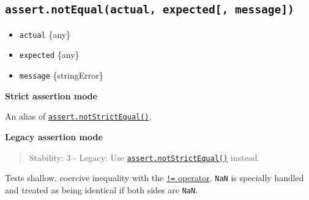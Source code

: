 \subsection{\texorpdfstring{\texttt{assert.notEqual(actual,\ expected{[},\ message{]})}}{assert.notEqual(actual, expected{[}, message{]})}}\label{assert.notequalactual-expected-message}

\begin{itemize}
\tightlist
\item
  \texttt{actual} \{any\}
\item
  \texttt{expected} \{any\}
\item
  \texttt{message} \{string\textbar Error\}
\end{itemize}

\textbf{Strict assertion mode}

An alias of
\hyperref[assertnotstrictequalactual-expected-message]{\texttt{assert.notStrictEqual()}}.

\textbf{Legacy assertion mode}

\begin{quote}
Stability: 3 - Legacy: Use
\hyperref[assertnotstrictequalactual-expected-message]{\texttt{assert.notStrictEqual()}}
instead.
\end{quote}

Tests shallow, coercive inequality with the
\href{https://developer.mozilla.org/en-US/docs/Web/JavaScript/Reference/Operators/Inequality}{\texttt{!=}
operator}. \texttt{NaN} is specially handled and treated as being
identical if both sides are \texttt{NaN}.

\begin{Shaded}
\begin{Highlighting}[]
 \OperatorTok{;}

\NormalTok{(}\OperatorTok{,} \NormalTok{)}\OperatorTok{;}

\NormalTok{(}\OperatorTok{,} \NormalTok{)}\OperatorTok{;}

\NormalTok{(}\OperatorTok{,} \StringTok{\textquotesingle{}1\textquotesingle{}}\NormalTok{)}\OperatorTok{;}
\end{Highlighting}
\end{Shaded}


